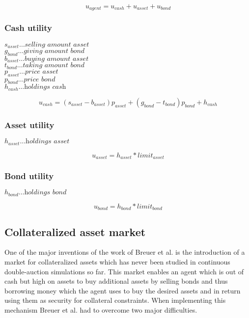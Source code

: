 \documentclass[../Bachelorarbeit.tex]{subfiles}
\begin{document}
\begin{equation}
u_{agent} = u_{cash} + u_{asset} + u_{bond}
\end{equation}

\subsubsection{Cash utility}
$s_{asset} \dots \textit{selling amount asset}$ \\
$g_{bond} \dots \textit{giving amount bond}$ \\
$b_{asset} \dots \textit{buying amount asset}$ \\
$t_{bond} \dots \textit{taking amount bond}$ \\
$p_{asset} \dots \textit{price asset}$ \\
$p_{bond} \dots \textit{price bond}$ \\
$h_{cash} \dots \textit{holdings cash}$

\begin{equation}
u_{cash} = (s_{asset} - b_{asset} ) p_{asset} + (g_{bond} - t_{bond}) p_{bond} + h_{cash}
\end{equation}

\subsubsection{Asset utility}
$h_{asset} \dots \textit{holdings asset}$ 

\begin{equation}
u_{asset} = h_{asset} * limit_{asset}
\end{equation}

\subsubsection{Bond utility}
$h_{bond} \dots \textit{holdings bond}$ 

\begin{equation}
u_{bond} = h_{bond} * limit_{bond}
\end{equation}

\subsection{Collateralized asset market}
One of the major inventions of the work of Breuer et al. is the introduction of a market for collateralized assets which has never been studied in continuous double-auction simulations so far. This market enables an agent which is out of cash but high on assets to buy additional assets by selling bonds and thus borrowing money which the agent uses to buy the desired assets and in return using them as security for collateral constraints. When implementing this mechanism Breuer et al. had to overcome two major difficulties.
\end{document}
